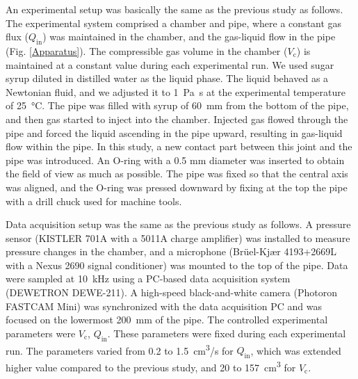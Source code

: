 \documentclass[aps,pre,preprint,groupedaddress,showkeys]{revtex4-2}
\begin{document}
An experimental setup was basically the same as the previous study as follows.
The experimental system comprised a chamber and pipe, where a constant gas flux ($Q_\mathrm{in}$) was maintained in the chamber, and the gas-liquid flow in the pipe (Fig. \ref{Apparatus}). 
The compressible gas volume in the chamber ($V_\mathrm{c}$) is maintained at a constant value during each experimental run.
We used sugar syrup diluted in distilled water as the liquid phase. 
The liquid behaved as a Newtonian fluid, and we adjusted it to \SI{1}{\Pa \s} at the experimental temperature of \SI{25}{\degreeCelsius}.
The pipe was filled with syrup of \SI{60}{mm} from the bottom of the pipe, and then gas started to inject into the chamber.
Injected gas flowed through the pipe and forced the liquid ascending in the pipe upward, resulting in gas-liquid flow within the pipe.
In this study, a new contact part between this joint and the pipe was introduced.
An O-ring with a 0.5 mm diameter was inserted to obtain the field of view as much as possible.
The pipe was fixed so that the central axis was aligned, and the O-ring was pressed downward by fixing at the top the pipe with a drill chuck used for machine tools.

Data acquisition setup was the same as the previous study as follows.
A pressure sensor (KISTLER 701A with a 5011A charge amplifier) was installed to measure pressure changes in the chamber, and a microphone (Br\"uel-Kj\ae r 4193+2669L with a Nexus 2690 signal conditioner) was mounted to the top of the pipe. 
Data were sampled at \SI{10}{kHz} using a PC-based data acquisition system (DEWETRON DEWE-211).
A high-speed black-and-white camera (Photoron FASTCAM Mini) was synchronized with the data acquisition PC and was focused on the lowermost \SI{200}{\mm} of the pipe.
The controlled experimental parameters were $V_\mathrm{c}$, $Q_\mathrm{in}$. 
These parameters were fixed during each experimental run. 
The parameters varied from 0.2 to \SI{1.5}{cm^3/s} for $Q_\mathrm{in}$, which was extended higher value compared to the previous study, and 20 to \SI{157} {\cm^3} for $V_\mathrm{c}$.
\end{document}
